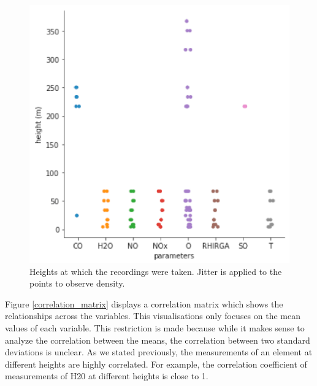 \begin{figure}
   \centering
   \includegraphics[width=\textwidth]{images/height.png}
   \caption{Heights at which the recordings were taken. Jitter is applied to the points to observe density.}
   \label{fig:height}
\end{figure}

Figure \ref{correlation_matrix} displays a correlation matrix which shows the relationships across the variables. This visualisations only focuses on the mean values of each variable. This restriction is made because while it makes sense to analyze the correlation between the means, the correlation between two standard deviations is unclear. As we stated previously, the measurements of an element at different heights are highly correlated. For example, the correlation coefficient of measurements of H20 at different heights is close to 1.

